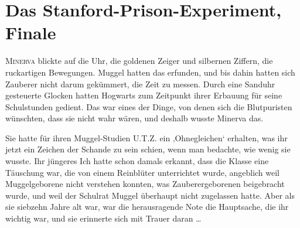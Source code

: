 \chapter{Das Stanford-Prison-Experiment, Finale}

\lettrine{M}{inerva} blickte auf die Uhr, die goldenen Zeiger und silbernen Ziffern, die ruckartigen Bewegungen. Muggel hatten das erfunden, und bis dahin hatten sich Zauberer nicht darum gekümmert, die Zeit zu messen. Durch eine Sanduhr gesteuerte Glocken hatten Hogwarts zum Zeitpunkt ihrer Erbauung für seine Schulstunden gedient. Das war eines der Dinge, von denen sich die Blutpuristen wünschten, dass sie nicht wahr wären, und deshalb wusste Minerva das.

Sie hatte für ihren Muggel-Studien U.T.Z. ein ‚Ohnegleichen‘ erhalten, was ihr jetzt ein Zeichen der Schande zu sein schien, wenn man bedachte, wie wenig sie wusste.%
Ihr jüngeres Ich hatte schon damals erkannt, dass die Klasse eine Täuschung war, die von einem Reinblüter unterrichtet wurde, angeblich weil Muggelgeborene nicht verstehen konnten, was Zauberergeborenen beigebracht wurde, und weil der Schulrat Muggel überhaupt nicht zugelassen hatte. Aber als sie siebzehn Jahre alt war, war die herausragende Note die Hauptsache, die ihr wichtig war, und sie erinnerte sich mit Trauer daran …

